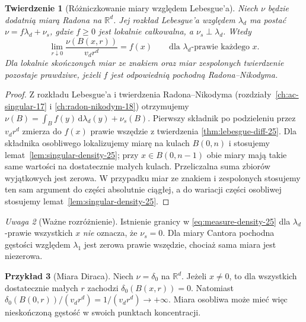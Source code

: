 \documentclass[11pt,a4paper,oneside]{book}
\numberwithin{equation}{chapter}
\theoremstyle{plain}
\newtheorem{twierdzenie}{Twierdzenie}[chapter]
\theoremstyle{definition}
\newtheorem{przyklad}[twierdzenie]{Przykład}
\theoremstyle{remark}
\newtheorem{uwaga}[twierdzenie]{Uwaga}
\begin{document}
\begin{twierdzenie}[Różniczkowanie miary względem Lebesgue'a]
\label{thm:measure-differentiation-25}
Niech $\nu$ będzie dodatnią miarą Radona na
$\mathbb R^d$. Jej rozkład Lebesgue'a względem
$\lambda_d$ ma postać $\nu=f\lambda_d+\nu_s$,
gdzie $f\ge0$ jest lokalnie całkowalna, a
$\nu_s\perp\lambda_d$. Wtedy
\begin{equation}\label{eq:measure-density-25}
 \lim_{r\downarrow0}\frac{\nu(B(x,r))}{v_dr^d}
 =f(x)\qquad\text{dla }\lambda_d\text{-prawie każdego }x.
\end{equation}
Dla lokalnie skończonych miar ze znakiem oraz miar
zespolonych twierdzenie pozostaje prawdziwe, jeżeli
$f$ jest odpowiednią pochodną Radona--Nikodyma.
\end{twierdzenie}
\begin{proof}
Z rozkładu Lebesgue'a i twierdzenia Radona--Nikodyma
(rozdziały~\ref{ch:ac-singular-17} i
\ref{ch:radon-nikodym-18}) otrzymujemy
$\nu(B)=\int_Bf(y)\,\mathrm d\lambda_d(y)+\nu_s(B)$.
Pierwszy składnik po podzieleniu przez $v_dr^d$
zmierza do $f(x)$ prawie wszędzie z twierdzenia
\ref{thm:lebesgue-diff-25}. Dla składnika osobliwego
lokalizujemy miarę na kulach $B(0,n)$ i stosujemy
lemat~\ref{lem:singular-density-25}; przy
$x\in B(0,n-1)$ obie miary mają takie same wartości
na dostatecznie małych kulach. Przeliczalna suma
zbiorów wyjątkowych jest zerowa. W przypadku miar ze
znakiem i zespolonych stosujemy ten sam argument do
części absolutnie ciągłej, a do wariacji części osobliwej
stosujemy lemat~\ref{lem:singular-density-25}.
\end{proof}

\begin{uwaga}[Ważne rozróżnienie]
Istnienie granicy w \eqref{eq:measure-density-25} dla
$\lambda_d$-prawie wszystkich $x$ \emph{nie} oznacza,
że $\nu_s=0$. Dla miary Cantora pochodna gęstości
względem $\lambda_1$ jest zerowa prawie wszędzie,
chociaż sama miara jest niezerowa.
\end{uwaga}

\begin{przyklad}[Miara Diraca]
Niech $\nu=\delta_0$ na $\mathbb R^d$. Jeżeli $x\ne0$,
to dla wszystkich dostatecznie małych $r$ zachodzi
$\delta_0(B(x,r))=0$. Natomiast
$\delta_0(B(0,r))/(v_dr^d)=1/(v_dr^d)\to+\infty$.
Miara osobliwa może mieć więc nieskończoną gęstość
w swoich punktach koncentracji.
\end{przyklad}
\end{document}
